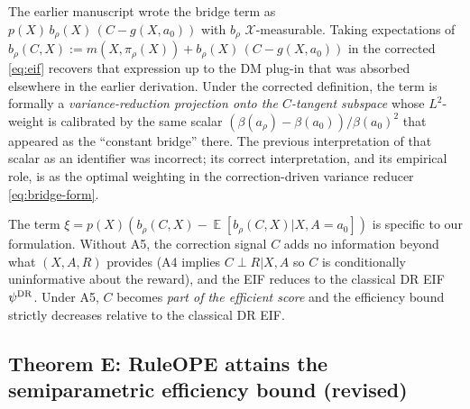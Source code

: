 \documentclass[11pt]{article}
\DeclareMathOperator{\E}{\mathbb{E}}
\begin{document}
\begin{remark}
The earlier manuscript wrote the bridge term as $p(X)\,b_\rho(X)\,(C - g(X, a_0))$
with $b_\rho$ $\mathcal{X}$-measurable.  Taking expectations of
$b_\rho(C, X) := m(X, \pi_\rho(X)) + b_\rho(X)\,(C - g(X, a_0))$ in
the corrected \eqref{eq:eif} recovers that expression up to the DM
plug-in that was absorbed elsewhere in the earlier derivation.
Under the corrected definition, the term is formally a
\emph{variance-reduction projection onto the $C$-tangent subspace}
whose $L^2$-weight is calibrated by the same scalar
$(\beta(a_\rho) - \beta(a_0))/\beta(a_0)^2$ that appeared as the
``constant bridge'' there.  The previous interpretation of that
scalar as an identifier was incorrect; its correct interpretation,
and its empirical role, is as the optimal weighting in the
correction-driven variance reducer \eqref{eq:bridge-form}.
\end{remark}

\begin{remark}
The term $\xi = p(X)(b_\rho(C, X) - \E[b_\rho(C, X) | X, A = a_0])$ is
specific to our formulation.  Without A5, the correction signal $C$
adds no information beyond what $(X, A, R)$ provides (A4 implies
$C \perp R | X, A$ so $C$ is conditionally uninformative about the
reward), and the EIF reduces to the classical DR EIF
$\psi^{\rm DR}$.  Under A5, $C$ becomes \emph{part of the efficient score} and
the efficiency bound strictly decreases relative to the classical DR EIF.
\end{remark}

\subsection{Theorem E: RuleOPE attains the semiparametric efficiency bound (revised)}
\end{document}
